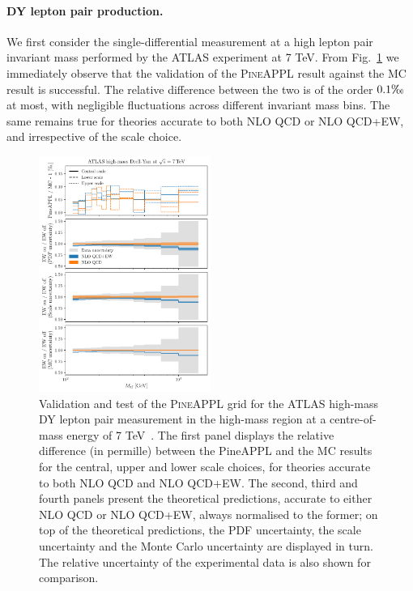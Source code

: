 \paragraph{DY lepton pair production.} 

We first consider the single-differential measurement at a high lepton pair
invariant mass performed by the ATLAS experiment at 7 TeV. 
From Fig.~\ref{fig:atlaszhighmass49fb} we immediately
observe that the validation of the \textsc{PineAPPL} result against the MC
result is successful. The relative difference between the two is of the order
$0.1\tcperthousand$ at most, with negligible fluctuations across different
invariant mass bins. The same remains true for theories accurate to both NLO
QCD or NLO QCD+EW, and irrespective of the scale choice.


\begin{figure}[!t]
    \centering
    \includegraphics[width=0.5\textwidth]{figures/pineappl_ATLASZHIGHMASS49FB}
    \caption{Validation and test of the \textsc{PineAPPL} grid for the ATLAS
      high-mass DY lepton pair measurement in the high-mass region at
      a centre-of-mass energy of 7 TeV~\cite{Aad:2013iua}. The first panel
      displays the relative difference (in permille) between the {\sc PineAPPL}
      and the {\sc MC} results for the central, upper and lower scale choices,
      for theories accurate to both NLO QCD and NLO QCD+EW. The second, third
      and fourth panels present the theoretical predictions, accurate to either
      NLO QCD or NLO QCD+EW, always normalised to the former; on top of the
      theoretical predictions, the PDF uncertainty, the scale uncertainty and
      the Monte Carlo uncertainty are displayed in turn. The relative
      uncertainty of the experimental data is also shown for comparison.}
    \label{fig:atlaszhighmass49fb}
\end{figure}



